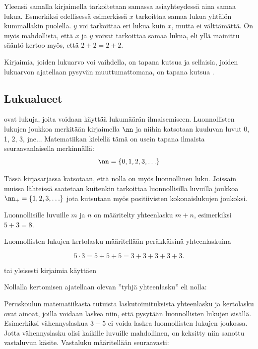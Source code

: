 Yleensä samalla kirjaimella tarkoitetaan samassa asiayhteydessä aina samaa lukua.
Esmerkiksi edellisessä esimerkissä $x$ tarkoittaa samaa lukua yhtälön kummallakin puolella. $y$ voi tarkoittaa eri lukua kuin $x$, mutta
ei välttämättä. On myös mahdollista, että $x$ ja $y$ voivat tarkoittaa samaa lukua, eli yllä mainittu sääntö kertoo myös, että $2+2=2+2$.

Kirjaimia, joiden lukuarvo voi vaihdella, on tapana kutsua  ja sellaisia,
joiden lukuarvon ajatellaan pysyvän muuttumattomana, on tapana kutsua .

\subsection*{Lukualueet}

 ovat lukuja, joita voidaan käyttää lukumäärän ilmaisemiseen.
Luonnollisten lukujen joukkoa merkitään kirjaimella $\nn$ ja niihin katsotaan kuuluvan luvut 0, 1, 2, 3, jne...
Matematiikan kielellä tämä on usein tapana ilmaista seuraavanlaisella merkinnällä: \[\nn = \{0, 1, 2, 3, \ldots\}\]

Tässä kirjasarjassa katsotaan, että nolla on myös luonnollinen luku. Joissain muissa lähteissä saatetaan kuitenkin
tarkoittaa luonnollisilla luvuilla joukkoa $\nn_+ = \{1, 2, 3, \ldots\}$ jota kutsutaan myös positiivisten kokonaislukujen joukoksi.

Luonnollisille luvuille $m$ ja $n$ on määritelty yhteenlasku $m + n$, esimerkiksi $5 + 3 = 8$.

Luonnollisten lukujen kertolasku määritellään peräkkäisinä yhteenlaskuina

\[5 \cdot 3 = 5 + 5 + 5 = 3 + 3 + 3 + 3 + 3.\]

tai yleisesti kirjaimia käyttäen

\laatikko{ \[m \cdot n = \underbrace{m + m + \ldots + m}_{n\text{ kpl}} = \underbrace{n + n + \ldots + n}_{m\text{ kpl}}.\] }

Nollalla kertomisen ajatellaan olevan ''tyhjä yhteenlasku'' eli nolla:
\laatikko{ \[0 \cdot m = 0\] }


Peruskoulun matematiikasta tutuista laskutoimituksista yhteenlasku ja kertolasku ovat ainoat,
joilla voidaan laskea niin, että pysytään luonnollisten lukujen sisällä. Esimerkiksi vähennyslaskua
$3-5$ ei voida laskea luonnollisten lukujen joukossa. Jotta vähennyslasku olisi kaikille luvuille
mahdollinen, on keksitty niin sanottu vastaluvun käsite. Vastaluku määritellään seuraavasti:

